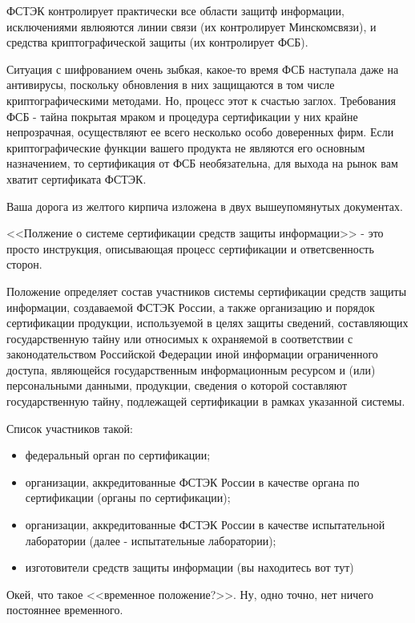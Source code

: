 ФСТЭК контролирует практически все области защитф информации, исключениями явлюяются линии связи (их контролирует Минскомсвязи), и средства криптографической защиты (их контролирует ФСБ).

Ситуация с шифрованием очень зыбкая, какое-то время ФСБ наступала даже на антивирусы, поскольку обновления в них защищаются в том числе криптографическими методами. Но, процесс этот к счастью заглох. Требования ФСБ - тайна покрытая мраком и процедура сертификации у них крайне непрозрачная, осуществляют ее всего несколько особо доверенных фирм. Если криптографические функции вашего продукта не являются его основным назначением, то сертификация от ФСБ необязательна, для выхода на рынок вам хватит сертификата ФСТЭК.

Ваша дорога из желтого кирпича изложена в двух вышеупомянутых документах.

<<Полжение о системе сертификации средств защиты информации>> - это просто инструкция, описывающая процесс сертификации и ответсвенность сторон.

Положение определяет состав участников системы сертификации средств защиты информации, создаваемой ФСТЭК России, а также организацию и порядок сертификации продукции, используемой в целях защиты сведений, составляющих государственную тайну или относимых к охраняемой в соответствии с законодательством Российской Федерации иной информации ограниченного доступа, являющейся государственным информационным ресурсом и (или) персональными данными, продукции, сведения о которой составляют государственную тайну, подлежащей сертификации в рамках указанной системы.

Список участников такой:
\begin{itemize}
    \item федеральный орган по сертификации;
    \item организации, аккредитованные ФСТЭК России в качестве органа по сертификации (органы по сертификации);
    \item организации, аккредитованные ФСТЭК России в качестве испытательной лаборатории (далее - испытательные лаборатории);
    \item изготовители средств защиты информации (вы находитесь вот тут)
\end{itemize}
Окей, что такое <<временное положение?>>. Ну, одно точно, нет ничего постояннее временного.

